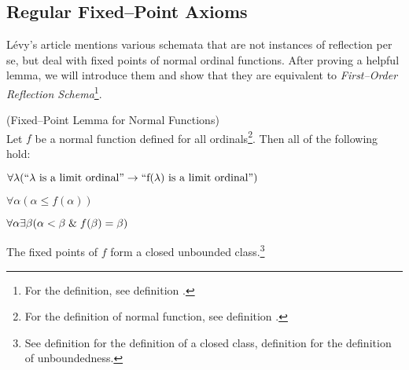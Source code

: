 \begin{comment}



\end{comment} %

\subsection{Regular Fixed–Point Axioms}\label{sec:regular_fixed_points}
Lévy's article mentions various schemata that are not instances of reflection per se, but deal with fixed points of normal ordinal functions. 
After proving a helpful lemma, we will introduce them and show that they are equivalent to \emph{First–Order Reflection Schema}\footnote{For the definition, see definition .}.

% 
%
%

\begin{lemma}{(Fixed–Point Lemma for Normal Functions)}\label{lemma:normal_fixed_point}\\
Let $f$ be a normal function defined for all ordinals\footnote{For the definition of normal function, see definition .}. Then all of the following hold:
\bce[(i)]
\item $\forall \lambda(\mbox{``$\lambda$ is a limit ordinal''} \rightarrow \mbox{``f($\lambda$) is a limit ordinal''})$
\item $\forall \alpha (\alpha \leq f(\alpha))$
\item $\forall \alpha \exists \beta (\alpha < \beta \mathrel{\&} f(\beta) = \beta)$
\item The fixed points of $f$ form a closed unbounded class.\footnote{See definition  for the definition of a closed class, definition  for the definition of unboundedness.}
\ece
\end{lemma}


